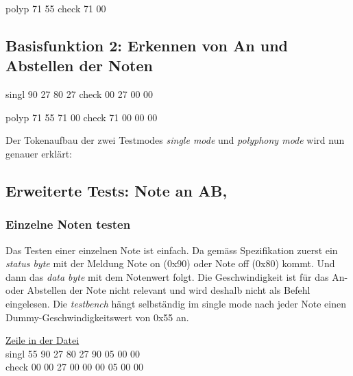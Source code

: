 polyp 71 55
check 71 00

\subsection*{Basisfunktion 2: Erkennen von An und Abstellen der Noten}

singl 90 27 80 27 
check 00 27 00 00 

polyp 71 55 71 00 
check 71 00 00 00 




Der Tokenaufbau der zwei Testmodes \textit{single mode} und \textit{polyphony mode }
wird nun genauer erklärt:

\subsection{Erweiterte Tests: Note an AB,}
 
\subsubsection{Einzelne Noten testen }
Das Testen einer einzelnen Note ist einfach. Da gemäss Spezifikation zuerst ein \textit{status byte} mit der Meldung Note on (0x90) oder Note off (0x80) kommt. Und dann das \textit{data byte} mit dem Notenwert folgt. Die Geschwindigkeit ist für das An- oder Abstellen der Note nicht relevant und wird deshalb nicht als Befehl eingelesen. Die \textit{testbench} hängt selbständig im single mode nach jeder Note einen Dummy-Geschwindigkeitswert von 0x55 an. \bigskip

\underline{Zeile in der Datei}\\
singl \hspace*{3mm} 55 \hspace*{4mm} 90 \hspace*{12mm}  27 \hspace*{6mm} 80 \hspace*{10mm} 27 \hspace*{6mm} 90 \hspace*{10mm} 05 \hspace*{6mm} 00 \hspace*{12mm} 00\\
check \hspace*{2mm} 00 \hspace*{4mm} 00 \hspace*{12mm}  27 \hspace*{6mm} 00 \hspace*{10mm} 00 \hspace*{6mm} 00 \hspace*{10mm} 05 \hspace*{6mm} 00 \hspace*{12mm} 00\\

